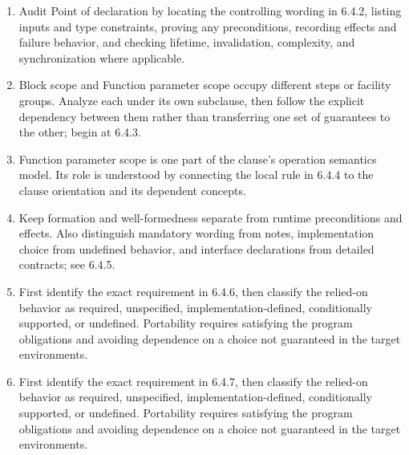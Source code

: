 \documentclass[11pt,letterpaper]{article}
\begin{document}
\begin{enumerate}
\item Audit Point of declaration by locating the controlling wording in 6.4.2, listing inputs and type constraints, proving any preconditions, recording effects and failure behavior, and checking lifetime, invalidation, complexity, and synchronization where applicable.
\item Block scope and Function parameter scope occupy different steps or facility groups. Analyze each under its own subclause, then follow the explicit dependency between them rather than transferring one set of guarantees to the other; begin at 6.4.3.
\item Function parameter scope is one part of the clause's operation semantics model. Its role is understood by connecting the local rule in 6.4.4 to the clause orientation and its dependent concepts.
\item Keep formation and well-formedness separate from runtime preconditions and effects. Also distinguish mandatory wording from notes, implementation choice from undefined behavior, and interface declarations from detailed contracts; see 6.4.5.
\item First identify the exact requirement in 6.4.6, then classify the relied-on behavior as required, unspecified, implementation-defined, conditionally supported, or undefined. Portability requires satisfying the program obligations and avoiding dependence on a choice not guaranteed in the target environments.
\item First identify the exact requirement in 6.4.7, then classify the relied-on behavior as required, unspecified, implementation-defined, conditionally supported, or undefined. Portability requires satisfying the program obligations and avoiding dependence on a choice not guaranteed in the target environments.
\end{enumerate}
\end{document}
